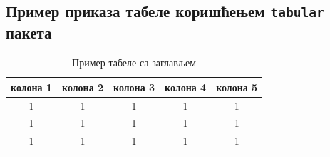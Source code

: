 \subsection{Пример приказа табеле коришћењем \texttt{tabular} пакета}
\begin{table}[H]
\centering
\begin{tabular}{@{}ccccc@{}}    %
\toprule
колона 1 & колона 2 & колона 3 & колона 4 & колона 5 \\ \midrule\midrule
1 & 1 & 1 & 1 & 1 \\
1 & 1 & 1 & 1 & 1 \\
1 & 1 & 1 & 1 & 1 \\ \bottomrule
\end{tabular}
\caption{Пример табеле са заглављем}
\label{table:example1}
\end{table}
